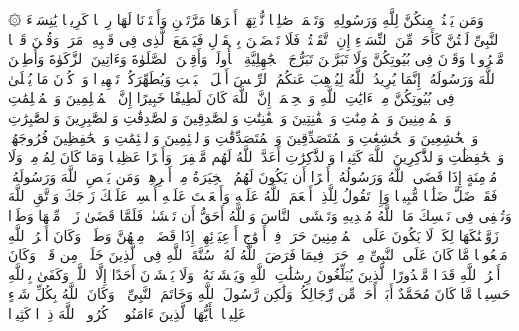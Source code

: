 \stopbuffer
\startbuffer[\q:33:31]
۞ وَمَن یَقۡنُتۡ مِنكُنَّ لِلَّهِ وَرَسُولِهِۦ وَتَعۡمَلۡ صَٰلِحࣰا نُّؤۡتِهَاۤ أَجۡرَهَا مَرَّتَیۡنِ وَأَعۡتَدۡنَا لَهَا رِزۡقࣰا كَرِیمࣰا%
\stopbuffer
\startbuffer[\q:33:32]
یَٰنِسَاۤءَ ٱلنَّبِیِّ لَسۡتُنَّ كَأَحَدࣲ مِّنَ ٱلنِّسَاۤءِ إِنِ ٱتَّقَیۡتُنَّۚ فَلَا تَخۡضَعۡنَ بِٱلۡقَوۡلِ فَیَطۡمَعَ ٱلَّذِی فِی قَلۡبِهِۦ مَرَضࣱ وَقُلۡنَ قَوۡلࣰا مَّعۡرُوفࣰا%
\stopbuffer
\startbuffer[\q:33:33]
وَقَرۡنَ فِی بُیُوتِكُنَّ وَلَا تَبَرَّجۡنَ تَبَرُّجَ ٱلۡجَٰهِلِیَّةِ ٱلۡأُولَىٰۖ وَأَقِمۡنَ ٱلصَّلَوٰةَ وَءَاتِینَ ٱلزَّكَوٰةَ وَأَطِعۡنَ ٱللَّهَ وَرَسُولَهُۥۤۚ إِنَّمَا یُرِیدُ ٱللَّهُ لِیُذۡهِبَ عَنكُمُ ٱلرِّجۡسَ أَهۡلَ ٱلۡبَیۡتِ وَیُطَهِّرَكُمۡ تَطۡهِیرࣰا%
\stopbuffer
\startbuffer[\q:33:34]
وَٱذۡكُرۡنَ مَا یُتۡلَىٰ فِی بُیُوتِكُنَّ مِنۡ ءَایَٰتِ ٱللَّهِ وَٱلۡحِكۡمَةِۚ إِنَّ ٱللَّهَ كَانَ لَطِیفًا خَبِیرًا%
\stopbuffer
\startbuffer[\q:33:35]
إِنَّ ٱلۡمُسۡلِمِینَ وَٱلۡمُسۡلِمَٰتِ وَٱلۡمُؤۡمِنِینَ وَٱلۡمُؤۡمِنَٰتِ وَٱلۡقَٰنِتِینَ وَٱلۡقَٰنِتَٰتِ وَٱلصَّٰدِقِینَ وَٱلصَّٰدِقَٰتِ وَٱلصَّٰبِرِینَ وَٱلصَّٰبِرَٰتِ وَٱلۡخَٰشِعِینَ وَٱلۡخَٰشِعَٰتِ وَٱلۡمُتَصَدِّقِینَ وَٱلۡمُتَصَدِّقَٰتِ وَٱلصَّٰۤئِمِینَ وَٱلصَّٰۤئِمَٰتِ وَٱلۡحَٰفِظِینَ فُرُوجَهُمۡ وَٱلۡحَٰفِظَٰتِ وَٱلذَّٰكِرِینَ ٱللَّهَ كَثِیرࣰا وَٱلذَّٰكِرَٰتِ أَعَدَّ ٱللَّهُ لَهُم مَّغۡفِرَةࣰ وَأَجۡرًا عَظِیمࣰا%
\stopbuffer
\startbuffer[\q:33:36]
وَمَا كَانَ لِمُؤۡمِنࣲ وَلَا مُؤۡمِنَةٍ إِذَا قَضَى ٱللَّهُ وَرَسُولُهُۥۤ أَمۡرًا أَن یَكُونَ لَهُمُ ٱلۡخِیَرَةُ مِنۡ أَمۡرِهِمۡۗ وَمَن یَعۡصِ ٱللَّهَ وَرَسُولَهُۥ فَقَدۡ ضَلَّ ضَلَٰلࣰا مُّبِینࣰا%
\stopbuffer
\startbuffer[\q:33:37]
وَإِذۡ تَقُولُ لِلَّذِیۤ أَنۡعَمَ ٱللَّهُ عَلَیۡهِ وَأَنۡعَمۡتَ عَلَیۡهِ أَمۡسِكۡ عَلَیۡكَ زَوۡجَكَ وَٱتَّقِ ٱللَّهَ وَتُخۡفِی فِی نَفۡسِكَ مَا ٱللَّهُ مُبۡدِیهِ وَتَخۡشَى ٱلنَّاسَ وَٱللَّهُ أَحَقُّ أَن تَخۡشَىٰهُۖ فَلَمَّا قَضَىٰ زَیۡدࣱ مِّنۡهَا وَطَرࣰا زَوَّجۡنَٰكَهَا لِكَیۡ لَا یَكُونَ عَلَى ٱلۡمُؤۡمِنِینَ حَرَجࣱ فِیۤ أَزۡوَٰجِ أَدۡعِیَاۤئِهِمۡ إِذَا قَضَوۡا۟ مِنۡهُنَّ وَطَرࣰاۚ وَكَانَ أَمۡرُ ٱللَّهِ مَفۡعُولࣰا%
\stopbuffer
\startbuffer[\q:33:38]
مَّا كَانَ عَلَى ٱلنَّبِیِّ مِنۡ حَرَجࣲ فِیمَا فَرَضَ ٱللَّهُ لَهُۥۖ سُنَّةَ ٱللَّهِ فِی ٱلَّذِینَ خَلَوۡا۟ مِن قَبۡلُۚ وَكَانَ أَمۡرُ ٱللَّهِ قَدَرࣰا مَّقۡدُورًا%
\stopbuffer
\startbuffer[\q:33:39]
ٱلَّذِینَ یُبَلِّغُونَ رِسَٰلَٰتِ ٱللَّهِ وَیَخۡشَوۡنَهُۥ وَلَا یَخۡشَوۡنَ أَحَدًا إِلَّا ٱللَّهَۗ وَكَفَىٰ بِٱللَّهِ حَسِیبࣰا%
\stopbuffer
\startbuffer[\q:33:40]
مَّا كَانَ مُحَمَّدٌ أَبَاۤ أَحَدࣲ مِّن رِّجَالِكُمۡ وَلَٰكِن رَّسُولَ ٱللَّهِ وَخَاتَمَ ٱلنَّبِیِّۦنَۗ وَكَانَ ٱللَّهُ بِكُلِّ شَیۡءٍ عَلِیمࣰا%
\stopbuffer
\startbuffer[\q:33:41]
یَٰۤأَیُّهَا ٱلَّذِینَ ءَامَنُوا۟ ٱذۡكُرُوا۟ ٱللَّهَ ذِكۡرࣰا كَثِیرࣰا%
